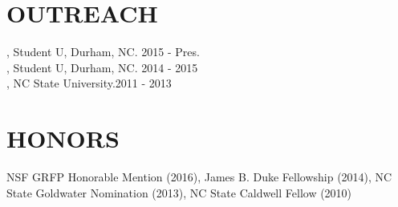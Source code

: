 \documentclass[resmargin, 11pt]{resume_style_class} %
\begin{document}
\begin{resume}

\section{OUTREACH}
\raggedright 
{}, Student U, Durham, NC. \hfill 2015 - Pres. \\
, Student U, Durham, NC. \hfill 2014 - 2015 \\
, NC State University.\hfill 2011 - 2013  

\section{HONORS}
NSF GRFP Honorable Mention (2016),
James B. Duke Fellowship (2014),
NC State Goldwater Nomination (2013),
NC State Caldwell Fellow (2010)
\end{resume}
\end{document}
